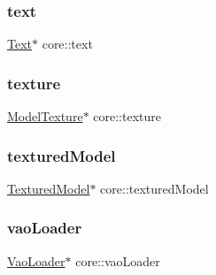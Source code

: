 \mbox{\label{namespacecore_a7f65917b3299aa904f0516343ec522db}} 
\subsubsection{\texorpdfstring{text}{text}}
{\footnotesize\ttfamily \hyperlink{classfont_1_1Text}{Text}$\ast$ core\+::text}

\mbox{\label{namespacecore_a0738503bf610d37d44b4938dc024bfcc}} 
\subsubsection{\texorpdfstring{texture}{texture}}
{\footnotesize\ttfamily \hyperlink{classtexture_1_1ModelTexture}{Model\+Texture}$\ast$ core\+::texture}

\mbox{\label{namespacecore_ad4d5c25548862489d6a237342748ad74}} 
\subsubsection{\texorpdfstring{textured\+Model}{texturedModel}}
{\footnotesize\ttfamily \hyperlink{classmodel_1_1TexturedModel}{Textured\+Model}$\ast$ core\+::textured\+Model}

\mbox{\label{namespacecore_a78dd24784c415d3759a0f71b8f4f9f81}} 
\subsubsection{\texorpdfstring{vao\+Loader}{vaoLoader}}
{\footnotesize\ttfamily \hyperlink{classcore_1_1VaoLoader}{Vao\+Loader}$\ast$ core\+::vao\+Loader}

